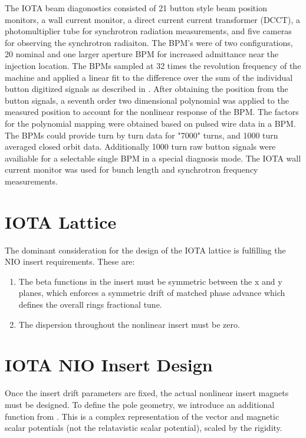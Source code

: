 The IOTA beam diagonostics consisted of 21 button style beam position monitors, a wall current monitor, a direct current current transformer (DCCT), a photomultiplier tube for synchrotron radiation measurements, and five cameras for observing the synchrotron radiaiton. The BPM's were of two configurations, 20 nominal and one larger aperture BPM for increased admittance near the injection location. The BPMs sampled at 32 times the revolution frequency of the machine and applied a linear fit to the difference over the sum of the individual button digitized signals as described in \cite{linearBPM}. After obtaining the position from the button signals, a seventh order two dimensional polynomial was applied to the measured position to account for the nonlinear response of the BPM. The factors for the polynomial mapping were obtained based on pulsed wire data in a BPM. The BPMs could provide turn by turn data for "7000" turns, and 1000 turn averaged closed orbit data. Additionally 1000 turn raw button signals were availiable for a selectable single BPM in a special diagnosis mode. The IOTA wall current monitor was used for bunch length and synchrotron frequency measurements. 

\section{IOTA Lattice}
The dominant consideration for the design of the IOTA lattice is fulfilling the NIO insert requirements. These are:

\begin{enumerate}
	\item The beta functions in the insert must be symmetric between the x and y planes, which enforces a symmetric drift of matched phase advance which defines the overall rings fractional tune.
	\item The dispersion throughout the nonlinear insert must be zero.
\end{enumerate}



\section{IOTA NIO Insert Design} \label{sec:nioDesign}
Once the insert drift parameters are fixed, the actual nonlinear insert magnets must be designed. To define the pole geometry, we introduce an additional function from \cite{mitchellComplex}. This is a complex representation of the vector and magnetic scalar potentials (not the relatavistic scalar potential), scaled by the rigidity.


